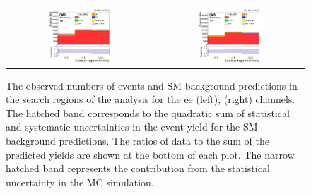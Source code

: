 \begin{figure}[ht]
  \begin{center}
    \begin{tabular}{cc}
      \includegraphics[width=0.45\textwidth]{figures/tW/fig/Result/ee/H_Limit_N_jet_bjet.png}&
      \includegraphics[width=0.45\textwidth]{figures/tW/fig/Result/mumu/H_Limit_N_jet_bjet.png}\\
    \end{tabular}
    \caption{The observed numbers of events and SM background predictions in the search regions of the analysis for the ee (left), \mumu (right) channels. The hatched band corresponds to the quadratic sum of statistical and systematic uncertainties in the event yield for the SM background predictions. The ratios of data to the sum of the predicted yields are shown at the bottom of each plot. The narrow hatched band represents the contribution from the statistical uncertainty in the MC simulation.
    \label{fig:binee}}
  \end{center}
\end{figure}



\clearpage







